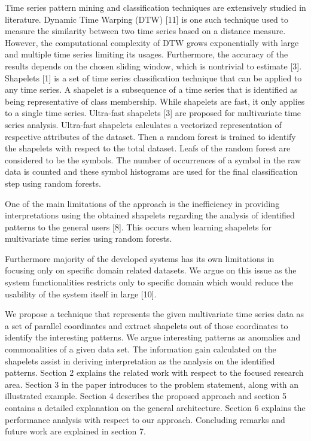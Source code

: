 \documentclass[letterpaper, 10 pt, conference]{IEEEtran}  %
\begin{document}
 
Time series pattern mining and classification techniques are extensively studied in literature. Dynamic Time Warping (DTW) [11] is one such technique used to measure the similarity between two time series based on a distance measure. However, the computational complexity of DTW grows exponentially with large and multiple time series limiting its usages. Furthermore, the accuracy of the results depends on the chosen sliding window, which is nontrivial to estimate [3]. Shapelets [1] is a set of time series classification technique that can be applied to any time series. A shapelet is a subsequence of a time series that is identified as being representative of class membership. While shapelets are fast, it only applies to a single time series. Ultra-fast shapelets [3] are proposed for multivariate time series analysis. Ultra-fast shapelets calculates a vectorized representation of respective attributes of the dataset. Then a  random forest is trained to identify the shapelets with respect to the total dataset. Leafs of the random forest are considered to be the symbols. The number of occurrences of a symbol in the raw data is counted and these symbol histograms are used for the final classification step using random forests.

One of the main limitations of the approach is the inefficiency in providing interpretations using the obtained shapelets regarding the analysis of identified patterns to the general users [8]. This occurs when learning shapelets for multivariate time series using random forests.

Furthermore majority of the developed systems has its own limitations in focusing only on specific domain related datasets. We argue on this issue as the system functionalities restricts only to specific domain which would reduce the usability of the system itself in large [10].

We propose a technique that represents the given multivariate time series data as a set of parallel coordinates and extract shapelets out of those coordinates to identify the interesting patterns. We argue interesting patterns as  anomalies and commonalities of a given data set. The information gain calculated on the shapelets assist in deriving interpretation as the analysis on the identified patterns. 
Section 2 explains the related work with respect to the focused research area. Section 3 in the paper introduces to the problem statement, along with an illustrated example. Section 4 describes the proposed approach and section 5 contains a detailed explanation on the general architecture. Section 6 explains the performance analysis with respect to our approach. Concluding remarks and future work are explained in section 7.
\end{document}
